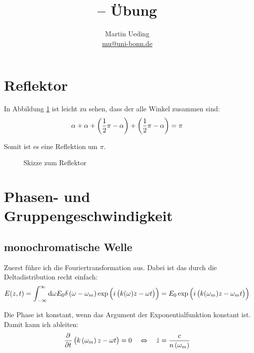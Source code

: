 \documentclass[11pt, ngerman, fleqn]{article}
\title{\themodul{} -- Übung \theuebung \\ \vspace{0.5cm} \large{\thegruppe}}
\author{Martin Ueding \\ \small{\href{mailto:mu@uni-bonn.de}{mu@uni-bonn.de}}}
\newcommand{\half}{\frac 12}
\begin{document}
\maketitle


\section{Reflektor}

In Abbildung \ref{fig:ref} ist leicht zu sehen, dass der alle Winkel zusammen
sind:
\[
	\alpha + \alpha + \del{\half \pi - \alpha} + \del{\half \pi - \alpha} = \pi
\]

Somit ist es eine Reflektion um $\pi$.

\begin{figure}[h]
	\centering
	\caption{Skizze zum Reflektor}
	\label{fig:ref}
\end{figure}


\section{Phasen- und Gruppengeschwindigkeit}

\subsection{monochromatische Welle}

Zuerst führe ich die Fouriertransformation aus. Dabei ist das durch die Deltadistribution recht einfach:
\[
	E(z, t)
	= \int_{-\infty}^\infty \dif \omega E_0 \delta\del{\omega - \omega_m} \exp\del{i\del{k(\omega) z - \omega t}}
	= E_0 \exp\del{i\del{k(\omega_m) z - \omega_m t}}
\]

Die Phase ist konstant, wenn das Argument der Exponentialfunktion konstant ist. Damit kann ich ableiten:
\[
	\dpd{}t \del{k\del{\omega_m} z - \omega t} = 0
	\quad \Leftrightarrow \quad
	\dot z = \frac{c}{n\del{\omega_m}}
\]
\end{document}
